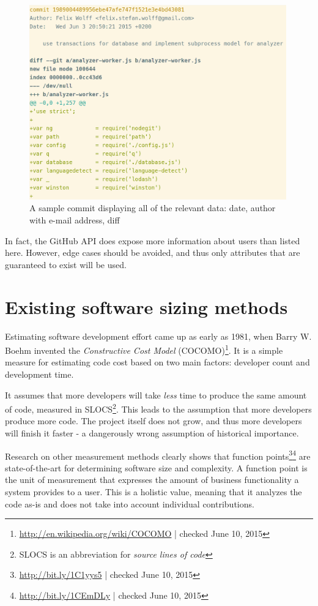 \begin{figure}
    \includegraphics[width=30em]{gfx/commit.png}
    \caption{A sample commit displaying all of the relevant data: date, author with e-mail address, diff}
    \label{fig:commit}
\end{figure}

In fact, the GitHub API does expose more information about users than listed here. However, edge cases should be avoided, and thus only attributes that are guaranteed to exist will be used.

\section{Existing software sizing methods}
Estimating software development effort came up as early as 1981, when Barry W. Boehm invented the \textit{Constructive Cost Model} (COCOMO)\footnote{\url{http://en.wikipedia.org/wiki/COCOMO} | checked June 10, 2015}.
It is a simple measure for estimating code cost based on two main factors: developer count and development time.
\newline

It assumes that more developers will take \textit{less} time to produce the same amount of code, measured in SLOCS\footnote{SLOCS is an abbreviation for \textit{source lines of code}}. This leads to the assumption that more developers produce more code. The project itself does not grow, and thus more developers will finish it faster - a dangerously wrong assumption of historical importance\cite{fb:1975}.
\newline

Research on other measurement methods clearly shows that function points\footnote{\url{http://bit.ly/1C1yys5} | checked June 10, 2015}\footnote{\url{http://bit.ly/1CEmDLy} | checked June 10, 2015} are state-of-the-art for determining software size and complexity\cite{linkedin:functionpointstandard}.
A function point is the unit of measurement that expresses the amount of business functionality a system provides to a user. This is a holistic value, meaning that it analyzes the code as-is and does not take into account individual contributions.

